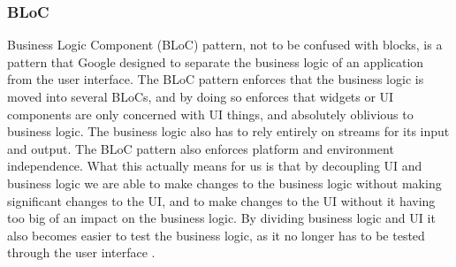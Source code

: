 \subsubsection{BLoC}
Business Logic Component (BLoC) pattern, not to be confused with blocks, is a pattern that Google designed to separate the business logic of an application from the user interface.
The BLoC pattern enforces that the business logic is moved into several BLoCs, and by doing so enforces that widgets or UI components are only concerned with UI things, and absolutely oblivious to business logic. 
The business logic also has to rely entirely on streams for its input and output.
The BLoC pattern also enforces platform and environment independence. 
What this actually means for us is that by decoupling UI and business logic we are able to make changes to the business logic without making significant changes to the UI, and to make changes to the UI without it having too big of an impact on the business logic. 
By dividing business logic and UI it also becomes easier to test the business logic, as it no longer has to be tested through the user interface \cite{Flutterintro}.
